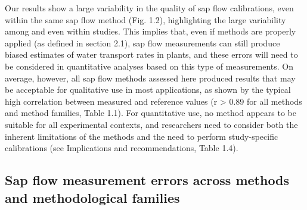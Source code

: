 \documentclass[11pt,twoside]{reedthesis}
\begin{document}
Our results show a large variability in the quality of sap flow
calibrations, even within the same sap flow method (Fig. 1.2),
highlighting the large variability among and even within studies. This
implies that, even if methods are properly applied (as defined in
section 2.1), sap flow measurements can still produce biased estimates
of water transport rates in plants, and these errors will need to be
considered in quantitative analyses based on this type of measurements.
On average, however, all sap flow methods assessed here produced results
that may be acceptable for qualitative use in most applications, as
shown by the typical high correlation between measured and reference
values (r \textgreater{} 0.89 for all methods and method families, Table
1.1). For quantitative use, no method appears to be suitable for all
experimental contexts, and researchers need to consider both the
inherent limitations of the methods and the need to perform
study-specific calibrations (see Implications and recommendations, Table
1.4).\par

\subsection{Sap flow measurement errors across methods and
methodological
families}\label{sap-flow-measurement-errors-across-methods-and-methodological-families}
\end{document}
